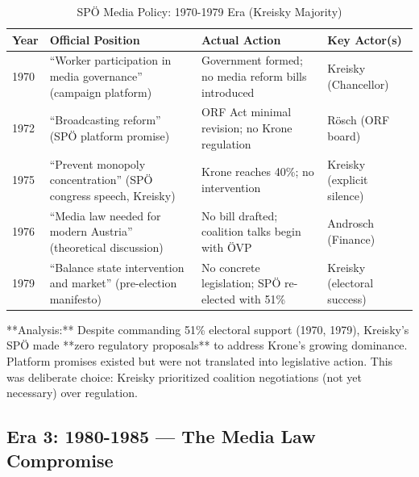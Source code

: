 \begin{table}[h]
\centering
\small
\caption{SPÖ Media Policy: 1970-1979 Era (Kreisky Majority)}
\label{tab:bh-media-policy-1970-1979}
\begin{tabular}{|p{2.5cm}|p{3cm}|p{3cm}|p{4cm}|}
\hline
\textbf{Year} & \textbf{Official Position} & \textbf{Actual Action} & \textbf{Key Actor(s)} \\
\hline
1970 & ``Worker participation in media governance'' (campaign platform) & Government formed; no media reform bills introduced & Kreisky (Chancellor) \\
\hline
1972 & ``Broadcasting reform'' (SPÖ platform promise) & ORF Act minimal revision; no Krone regulation & Rösch (ORF board) \\
\hline
1975 & ``Prevent monopoly concentration'' (SPÖ congress speech, Kreisky) & Krone reaches 40\%; no intervention & Kreisky (explicit silence) \\
\hline
1976 & ``Media law needed for modern Austria'' (theoretical discussion) & No bill drafted; coalition talks begin with ÖVP & Androsch (Finance) \\
\hline
1979 & ``Balance state intervention and market'' (pre-election manifesto) & No concrete legislation; SPÖ re-elected with 51\% & Kreisky (electoral success) \\
\hline
\end{tabular}
\end{table}

**Analysis:** Despite commanding 51\% electoral support (1970, 1979), Kreisky's SPÖ made **zero regulatory proposals**
to address Krone's growing dominance. Platform promises existed but were not translated into legislative action. This was
deliberate choice: Kreisky prioritized coalition negotiations (not yet necessary) over regulation.

\subsection*{Era 3: 1980-1985 --- The Media Law Compromise}

